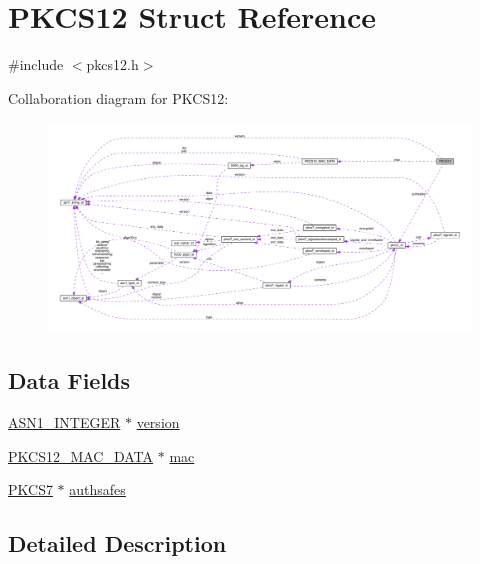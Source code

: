 \hypertarget{struct_p_k_c_s12}{}\section{P\+K\+C\+S12 Struct Reference}
\label{struct_p_k_c_s12}


{\ttfamily \#include $<$pkcs12.\+h$>$}



Collaboration diagram for P\+K\+C\+S12\+:\nopagebreak
\begin{figure}[H]
\begin{center}
\leavevmode
\includegraphics[width=350pt]{struct_p_k_c_s12__coll__graph}
\end{center}
\end{figure}
\subsection*{Data Fields}
\begin{DoxyCompactItemize}
\item 
\hyperlink{crypto_2ossl__typ_8h_af4335399bf9774cb410a5e93de65998b}{A\+S\+N1\+\_\+\+I\+N\+T\+E\+G\+ER} $\ast$ \hyperlink{struct_p_k_c_s12_abf367aeef355b6acf5be7c569c4b28b0}{version}
\item 
\hyperlink{struct_p_k_c_s12___m_a_c___d_a_t_a}{P\+K\+C\+S12\+\_\+\+M\+A\+C\+\_\+\+D\+A\+TA} $\ast$ \hyperlink{struct_p_k_c_s12_a1f12dbea9e53e4cc1c85a566df83de0b}{mac}
\item 
\hyperlink{crypto_2pkcs7_2pkcs7_8h_af773f722a43f0fee6be7bfc1721c5290}{P\+K\+C\+S7} $\ast$ \hyperlink{struct_p_k_c_s12_aaceb6025ce170d9984cef68788e96c8f}{authsafes}
\end{DoxyCompactItemize}


\subsection{Detailed Description}


